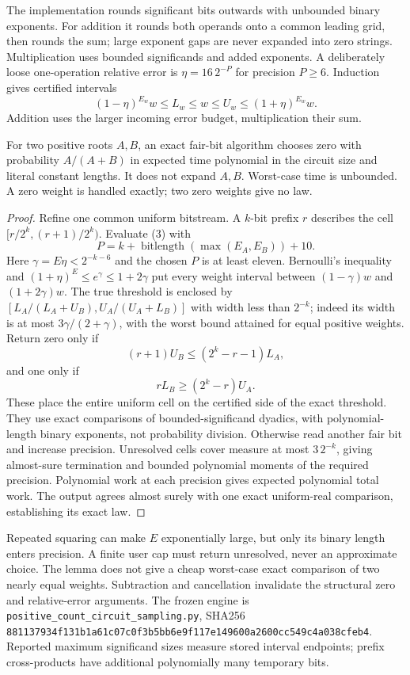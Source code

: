 \documentclass[11pt]{article}
\begin{document}
The implementation rounds significant bits outwards with unbounded binary
exponents. For addition it rounds both operands onto a common leading grid,
then rounds the sum; large exponent gaps are never expanded into zero strings.
Multiplication uses bounded significands and added exponents. A deliberately
loose one-operation relative error is $\eta=16\,2^{-P}$ for precision $P\ge6$.
Induction gives certified intervals
\[
       (1-\eta)^{E_w}w\le L_w\le w\le U_w\le(1+\eta)^{E_w}w.    \tag{3}
\]
Addition uses the larger incoming error budget, multiplication their sum.

\begin{lemma}
For two positive roots $A,B$, an exact fair-bit algorithm chooses zero with
probability $A/(A+B)$ in expected time polynomial in the circuit size and
literal constant lengths. It does not expand $A,B$. Worst-case time is
unbounded. A zero weight is handled exactly; two zero weights give no law.
\end{lemma}
\begin{proof}
Refine one common uniform bitstream. A $k$-bit prefix $r$ describes the cell
$[r/2^k,(r+1)/2^k)$. Evaluate (3) with
\[
 P=k+\operatorname{bitlength}(\max(E_A,E_B))+10.
\]
Here $\gamma=E\eta<2^{-k-6}$ and the chosen $P$ is at least eleven.
Bernoulli's inequality and $(1+\eta)^E\le e^\gamma\le1+2\gamma$
put every weight interval between $(1-\gamma)w$ and $(1+2\gamma)w$.
The true threshold is enclosed by
$[L_A/(L_A+U_B),U_A/(U_A+L_B)]$ with width less than $2^{-k}$;
indeed its width is at most $3\gamma/(2+\gamma)$, with the worst bound
attained for equal positive weights.
Return zero only if
\[
                   (r+1)U_B\le(2^k-r-1)L_A,
\]
and one only if
\[
                         rL_B\ge(2^k-r)U_A.
\]
These place the entire uniform cell on the certified side of the exact
threshold. They use exact comparisons of bounded-significand dyadics, with
polynomial-length binary exponents, not probability division.
Otherwise read another fair bit and increase precision. Unresolved cells
cover measure at most $3\,2^{-k}$, giving almost-sure termination and bounded
polynomial moments of the required precision. Polynomial work at each
precision gives expected polynomial total work. The output agrees almost
surely with one exact uniform-real comparison, establishing its exact law.
\end{proof}

Repeated squaring can make $E$ exponentially large, but only its binary length
enters precision. A finite user cap must return unresolved, never an
approximate choice. The lemma does not give a cheap worst-case exact comparison
of two nearly equal weights. Subtraction and cancellation invalidate the
structural zero and relative-error arguments.
The frozen engine is \nolinkurl{positive_count_circuit_sampling.py}, SHA256
\nolinkurl{881137934f131b1a61c07c0f3b5bb6e9f117e149600a2600cc549c4a038cfeb4}.
Reported maximum significand sizes measure stored interval endpoints;
prefix cross-products have additional polynomially many temporary bits.
\end{document}
